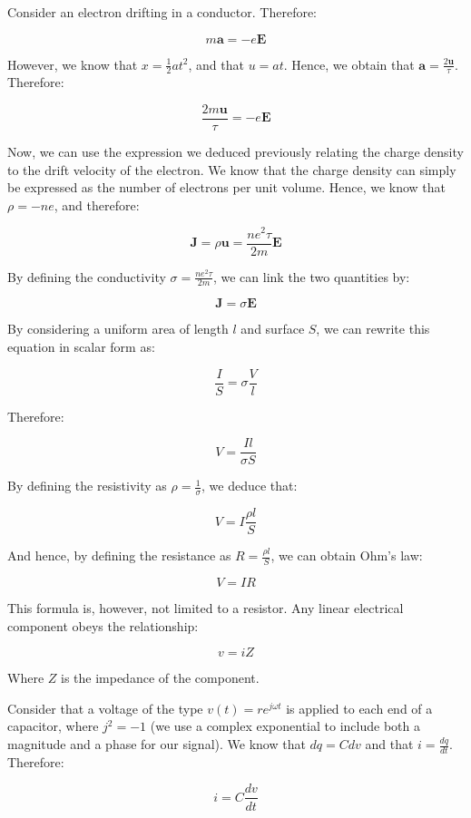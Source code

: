 \documentclass{article}
\begin{document}
\begin{proposition}
Consider an electron drifting in a conductor. Therefore:

\[ m\mathbf{a} = -e\mathbf{E} \]

However, we know that $x = \frac{1}{2}at^2$, and that $u = at$. Hence, we obtain that $\mathbf{a} = \frac{2\mathbf{u}}{\tau}$. Therefore:

\[ \frac{2m\mathbf{u}}{\tau} = -e\mathbf{E} \]

Now, we can use the expression we deduced previously relating the charge density to the drift velocity of the electron. We know that the charge density can simply be expressed as the number of electrons per unit volume. Hence, we know that $\rho = -ne$, and therefore:

\[ \mathbf{J} = \rho\mathbf{u} = \frac{ne^2\tau}{2m}\mathbf{E} \]

By defining the conductivity $\sigma = \frac{ne^2\tau}{2m}$, we can link the two quantities by:

\[ \mathbf{J} = \sigma\mathbf{E} \]

By considering a uniform area of length $l$ and surface $S$, we can rewrite this equation in scalar form as:

\[ \frac{I}{S} = \sigma \frac{V}{l} \]

Therefore:

\[ V = \frac{Il}{\sigma S} \]

By defining the resistivity as $\rho = \frac{1}{\sigma}$, we deduce that:

\[ V = I \frac{\rho l}{S} \]

And hence, by defining the resistance as $R = \frac{\rho l}{S}$, we can obtain Ohm's law:

\[ V = IR \]

This formula is, however, not limited to a resistor. Any linear electrical component obeys the relationship:

\[ v = iZ \]

Where $Z$ is the impedance of the component.

\begin{proposition}
    Consider that a voltage of the type $v(t) = re^{j\omega t}$ is applied to each end of a capacitor, where $j^2 = -1$ (we use a complex exponential to include both a magnitude and a phase for our signal). We know that $dq = Cdv$ and that $i = \frac{dq}{dt}$. Therefore:

    \[ i = C\frac{dv}{dt} \]


\end{proposition}
\end{proposition}
\end{document}

